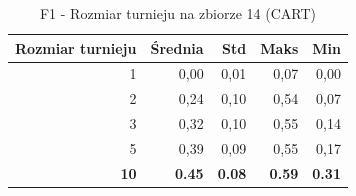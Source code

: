 \begin{table}[htbp]
\centering
\small
\setlength{\tabcolsep}{6pt}
\renewcommand{\arraystretch}{1.2}
\caption{F1 - Rozmiar turnieju na zbiorze 14 (CART)}
\label{tab:CART_tournament_size_14_f1}
\begin{tabular}{r|r|r|r|r}
\toprule
Rozmiar turnieju & Średnia & Std & Maks & Min \\
\hline
1 & 0,00 & 0,01 & 0,07 & 0,00 \\
2 & 0,24 & 0,10 & 0,54 & 0,07 \\
3 & 0,32 & 0,10 & 0,55 & 0,14 \\
5 & 0,39 & 0,09 & 0,55 & 0,17 \\
\textbf{10} & \textbf{0.45} & \textbf{0.08} & \textbf{0.59} & \textbf{0.31} \\
\bottomrule
\end{tabular}
\end{table}